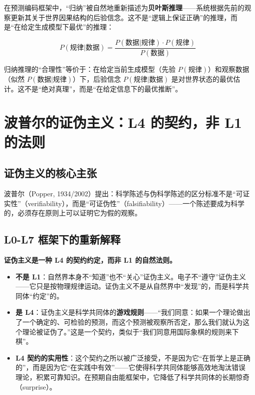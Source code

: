 \documentclass[UTF8,12pt,a4paper]{ctexart}
\begin{document}
在预测编码框架中，``归纳''被自然地重新描述为\textbf{贝叶斯推理}——系统根据先前的观察更新其关于世界因果结构的后验信念。这不是``逻辑上保证正确''的推理，而是``在给定生成模型下最优''的推理：

\begin{equation}
P(\text{规律}|\text{数据}) = \frac{P(\text{数据}|\text{规律}) \cdot P(\text{规律})}{P(\text{数据})}
\end{equation}

归纳推理的``合理性''等价于：在给定当前生成模型（先验 $P(\text{规律})$）和观察数据（似然 $P(\text{数据}|\text{规律})$）下，后验信念 $P(\text{规律}|\text{数据})$ 是对世界状态的最优估计。这不是``绝对真理''，而是``在给定信息下的最优推断''。

\section{波普尔的证伪主义：L4 的契约，非 L1 的法则}

\subsection{证伪主义的核心主张}

波普尔（Popper, 1934/2002）提出：科学陈述与伪科学陈述的区分标准不是``可证实性''（verifiability），而是``可证伪性''（falsifiability）——一个陈述要成为科学的，必须存在原则上可以证明它为假的观察。

\subsection{L0-L7 框架下的重新解释}

\textbf{证伪主义是一种 L4 的契约约定，而非 L1 的自然法则。}

\begin{itemize}[nosep]
    \item \textbf{不是 L1}：自然界本身不``知道''也不``关心''证伪主义。电子不``遵守''证伪主义——它只是按物理规律运动。证伪主义不是从自然界中``发现''的，而是科学共同体``约定''的。
    \item \textbf{是 L4}：证伪主义是科学共同体的\textbf{游戏规则}——``我们同意：如果一个理论做出了一个确定的、可检验的预测，而这个预测被观察所否定，那么我们就认为这个理论被证伪了。''这是一个契约，类似于``我们同意用国际象棋的规则来下棋''。
    \item \textbf{L4 契约的实用性}：这个契约之所以被广泛接受，不是因为它``在哲学上是正确的''，而是因为它``在实践中有效''——它使得科学共同体能够高效地淘汰错误理论，积累可靠知识。在预期自由能框架中，它降低了科学共同体的长期惊奇（surprise）。
\end{itemize}
\end{document}
